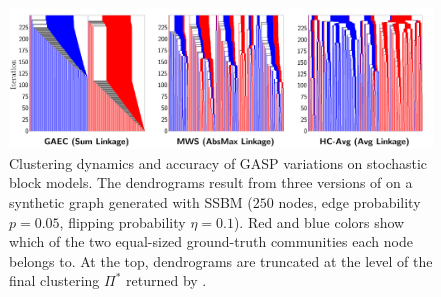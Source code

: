 \begin{figure}[tp]
\centering
\includegraphics[width=\textwidth,trim=0 10 60 0, clip]{./figures/GASP/dendrograms/new_agglo_order.png} %
\caption{Clustering dynamics and accuracy of GASP variations on stochastic block models. The dendrograms result from three versions of \algname{} on a synthetic graph generated with SSBM ($250$ nodes, edge probability $p=0.05$, flipping probability $\eta=0.1$).  Red and blue colors show which of the two equal-sized ground-truth communities each node belongs to. At the top, dendrograms are truncated at the level of the final clustering $\Pi^*$ returned by \algname{}. \label{fig:dendrograms}}
\end{figure}

